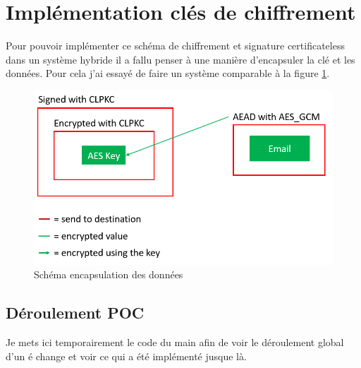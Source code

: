 \section{Implémentation clés  de chiffrement}
Pour pouvoir implémenter ce schéma de chiffrement et signature certificateless dans un système hybride il a fallu penser à une manière d'encapsuler la clé et les données. Pour cela j'ai essayé de faire un système comparable à la figure \ref{fig:encapsulate}. 
\begin{figure}[h!]
	\centering
	\includegraphics[width=12cm]{images/schemaEncapsulation.png}
	\caption{Schéma encapsulation des données}
	\label{fig:encapsulate}
\end{figure}

\subsection{Déroulement POC}
Je mets ici temporairement le code du main afin de voir le déroulement global d'un é change et voir ce qui a été implémenté jusque là.
\inputminted[linenos, numbersep=4pt,fontsize=\footnotesize, breaklines=true]{C}{source_code/main.c}